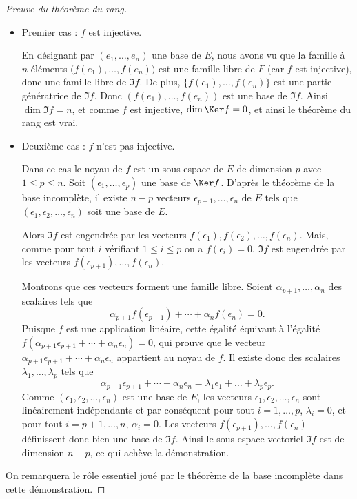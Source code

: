 \documentclass[class=report,crop=false]{standalone}
\begin{document}
\begin{proof}[Preuve du théorème du rang]
~
\begin{itemize}
  \item Premier cas : $f$ est injective.

En désignant par $(e_1 , \ldots , e_n)$ une base de $E$, nous avons vu que la famille à $n$ éléments
$\big( f(e_1) , \dots , f(e_n) \big)$ est une famille libre de $F$ (car $f$ est injective), donc une
famille libre de $\Im f$. De plus, $\big\{f(e_1) , \ldots , f(e_n)\big\}$
est une partie génératrice de $\Im f$. Donc
$\left ( f(e_1) , \ldots , f(e_n)\right )$ est une base de $\Im f$.
Ainsi $\dim \Im f = n$, et comme $f$ est injective, $\dim \Ker f = 0$,
et ainsi le théorème du rang est vrai.

  \item Deuxième cas : $f$ n'est pas injective.

  Dans ce cas le noyau de $f$ est un sous-espace de $E$
de dimension $p$ avec $1 \le p \le n$. Soit
$(\epsilon_1 , \ldots , \epsilon_p)$ une base de $\Ker f$.
D'après le théorème de la base incomplète, il existe $n-p$
vecteurs $\epsilon_{p+1},\ldots ,\epsilon_n$
de $E$ tels que $(\epsilon_1 , \epsilon_2 , \ldots ,\epsilon_n)$
soit une base de $E$.

Alors $\Im f$ est engendrée par les vecteurs
$f(\epsilon_1) , f(\epsilon_2) , \ldots ,f(\epsilon_n)$.
Mais, comme pour tout $i$ vérifiant $1 \le i \le p$ on a
$f(\epsilon_i)=0$, $\Im f$ est engendrée par les vecteurs
$f(\epsilon_{p+1}), \dots ,f(\epsilon_n)$.


Montrons que  ces vecteurs forment une famille libre.
Soient $\alpha_{p+1}, \ldots ,\alpha_n$ des scalaires tels que
$$\alpha_{p+1} f(\epsilon_{p+1}) + \cdots + \alpha_n f( \epsilon_n) =0.$$
Puisque $f$ est une application linéaire, cette égalité équivaut à l'égalité
$f \left ( \alpha_{p+1} \epsilon_{p+1} + \cdots + \alpha_n
  \epsilon_n\right ) =0$, qui prouve que le vecteur
$\alpha_{p+1} \epsilon_{p+1} + \cdots + \alpha_n \epsilon_n$
 appartient au noyau de $f$. Il existe donc des scalaires
$\lambda_1 ,\ldots , \lambda_p$ tels que
$$\alpha_{p+1} \epsilon_{p+1} + \cdots + \alpha_n \epsilon_n =
\lambda_1 \epsilon_1
+ \dots +\lambda_p \epsilon _p.$$
Comme $(\epsilon_1 , \epsilon_2 , \ldots ,\epsilon_n)$ est une base de $E$,
les vecteurs $\epsilon_1 , \epsilon_2 , \ldots ,\epsilon_n $
sont linéairement indépendants et par conséquent pour tout
$i = 1,\ldots,p$, $\lambda_i =0$, et pour tout
$i = p+1,\ldots,n$, $\alpha_i =0$.
Les vecteurs $f(\epsilon_{p+1}),\ldots , f (\epsilon_n)$
définissent donc bien une base de $\Im f$. Ainsi le sous-espace vectoriel $\Im f$
est de dimension $n-p$, ce qui achève la démonstration.
\end{itemize}
On remarquera le rôle essentiel joué par le théorème de la base
incomplète dans cette démonstration.
\end{proof}
\end{document}
